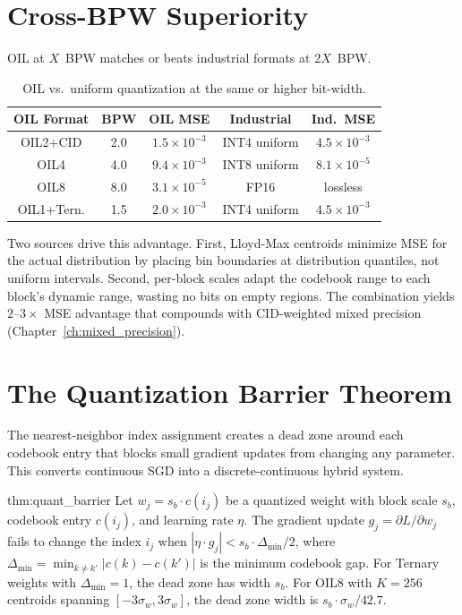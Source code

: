 \section{Cross-BPW Superiority}
\label{sec:cross_bpw}

OIL at $X$~BPW matches or beats industrial formats at $2X$~BPW.

\begin{table}[htbp]
\centering
\caption{OIL vs.\ uniform quantization at the same or higher bit-width.}
\label{tab:cross_bpw}
\begin{tabular}{ccccc}
\toprule
\textbf{OIL Format} & \textbf{BPW} & \textbf{OIL MSE} &
\textbf{Industrial} & \textbf{Ind.\ MSE} \\
\midrule
OIL2+CID    & 2.0 & $1.5 \times 10^{-3}$ & INT4 uniform  & $4.5 \times 10^{-3}$ \\
OIL4        & 4.0 & $9.4 \times 10^{-3}$ & INT8 uniform  & $8.1 \times 10^{-5}$ \\
OIL8        & 8.0 & $3.1 \times 10^{-5}$ & FP16          & lossless \\
OIL1+Tern.  & 1.5 & $2.0 \times 10^{-3}$ & INT4 uniform  & $4.5 \times 10^{-3}$ \\
\bottomrule
\end{tabular}
\end{table}

Two sources drive this advantage. First, Lloyd-Max centroids minimize
MSE for the actual distribution by placing bin boundaries at
distribution quantiles, not uniform intervals. Second, per-block
scales adapt the codebook range to each block's dynamic range,
wasting no bits on empty regions. The combination yields $2$--$3\times$
MSE advantage that compounds with CID-weighted mixed precision
(Chapter~\ref{ch:mixed_precision}).

\section{The Quantization Barrier Theorem}
\label{sec:quantization_barrier}

The nearest-neighbor index assignment creates a dead zone around each
codebook entry that blocks small gradient updates from changing any
parameter. This converts continuous SGD into a discrete-continuous
hybrid system.

\begin{mythm}{thm:quant_barrier}
Let $w_j = s_b \cdot c(i_j)$ be a quantized weight with block scale
$s_b$, codebook entry $c(i_j)$, and learning rate $\eta$. The gradient
update $g_j = \partial L / \partial w_j$ fails to change the index
$i_j$ when $|\eta \cdot g_j| < s_b \cdot \Delta_{\min} / 2$, where
$\Delta_{\min} = \min_{k \neq k'} |c(k) - c(k')|$ is the minimum
codebook gap. For Ternary weights with $\Delta_{\min} = 1$, the dead
zone has width $s_b$. For OIL8 with $K = 256$ centroids spanning
$[-3\sigma_w, 3\sigma_w]$, the dead zone width is
$s_b \cdot \sigma_w / 42.7$.
\end{mythm}

